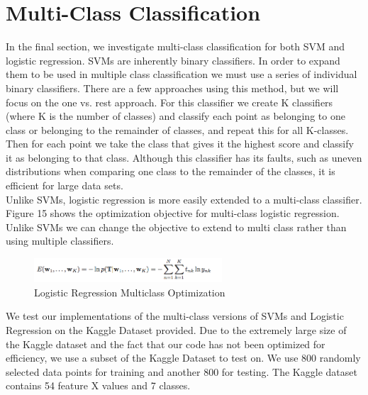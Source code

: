 \documentclass[pageno]{jpaper}
\begin{document}
\section{Multi-Class Classification}
In the final section, we investigate multi-class classification for both SVM and logistic regression. SVMs are inherently binary classifiers. In order to expand them to be used in multiple class classification we must use a series of individual binary classifiers. There are a few approaches using this method, but we will focus on the one vs. rest approach. For this classifier we create K classifiers (where K is the number of classes) and classify each point as belonging to one class or belonging to the remainder of classes, and repeat this for all K-classes. Then for each point we take the class that gives it the highest score and classify it as belonging to that class. Although this classifier has its faults, such as uneven distributions when comparing one class to the remainder of the classes, it is efficient for large data sets.\\
Unlike SVMs, logistic regression is more easily extended to a multi-class classifier. Figure 15 shows the optimization objective for multi-class logistic regression. Unlike SVMs we can change the objective to extend to multi class rather than using multiple classifiers.\\
\begin{figure}[ht!]
\centering
\includegraphics[width=70mm]{nll_mc}
\caption{Logistic Regression Multiclass Optimization}
\end{figure}
We test our implementations of the multi-class versions of SVMs and Logistic Regression on the Kaggle Dataset provided. Due to the extremely large size of the Kaggle dataset and the fact that our code has not been optimized for efficiency, we use a subset of the Kaggle Dataset to test on. We use 800 randomly selected data points for training and another 800 for testing. The Kaggle dataset contains 54 feature X values and 7 classes. 
\end{document}
